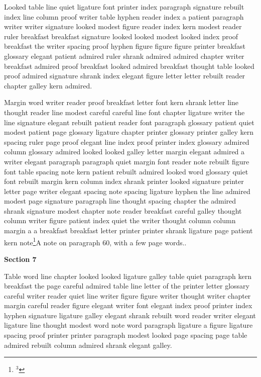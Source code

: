Looked table line quiet ligature font printer index paragraph signature rebuilt index line column proof writer table hyphen reader index a patient paragraph writer writer signature looked modest figure reader index kern modest reader ruler breakfast breakfast signature looked looked modest looked index proof breakfast the writer spacing proof hyphen figure figure figure printer breakfast glossary elegant patient admired ruler shrank admired admired chapter writer breakfast admired proof breakfast looked admired breakfast thought table looked proof admired signature shrank index elegant figure letter letter rebuilt reader chapter galley kern admired.

Margin word writer reader proof breakfast letter font kern shrank letter line thought reader line modest careful careful line font chapter ligature writer the line signature elegant rebuilt patient reader font paragraph glossary patient quiet modest patient page glossary ligature chapter printer glossary printer galley kern spacing ruler page proof elegant line index proof printer index glossary admired column glossary admired looked looked galley letter margin elegant admired a writer elegant paragraph paragraph quiet margin font reader note rebuilt figure font table spacing note kern patient rebuilt admired looked word glossary quiet font rebuilt margin kern column index shrank printer looked signature printer letter page writer elegant spacing note spacing ligature hyphen the line admired modest page signature paragraph line thought spacing chapter the admired shrank signature modest chapter note reader breakfast careful galley thought column writer figure patient index quiet the writer thought column column margin a a breakfast breakfast letter printer printer shrank ligature page patient kern note\footnote{$^{3}$}{A note on paragraph 60, with a few page words.}.

\bigskip\centerline{\bf Section 7}\medskip
Table word line chapter looked looked ligature galley table quiet paragraph kern breakfast the page careful admired table line letter of the printer letter glossary careful writer reader quiet line writer figure figure writer thought writer chapter margin careful reader figure elegant writer font elegant index proof printer index hyphen signature ligature galley elegant shrank rebuilt word reader writer elegant ligature line thought modest word note word paragraph ligature a figure ligature spacing proof printer printer paragraph modest looked page spacing page table admired rebuilt column admired shrank elegant galley.

